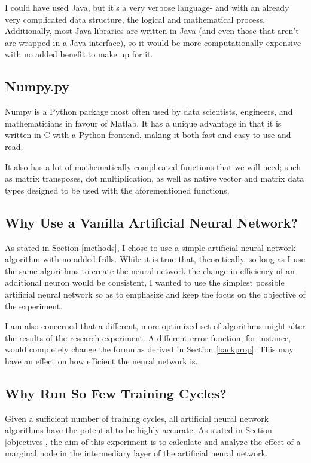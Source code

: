 \documentclass[12pt]{article}
\begin{document}
I could have used Java, but it's a very verbose language- and with an already very complicated data structure, the logical and mathematical process. Additionally, most Java libraries are written in Java (and even those that aren't are wrapped in a Java interface), so it would be more computationally expensive with no added benefit to make up for it.

\subsection{Numpy.py}

Numpy is a Python package most often used by data scientists, engineers, and mathematicians in favour of Matlab. It has a unique advantage in that it is written in C with a Python frontend, making it both fast and easy to use and read.

It also has a lot of mathematically complicated functions that we will need; such as matrix transposes, dot multiplication, as well as native vector and matrix data types designed to be used with the aforementioned functions.

\subsection{Why Use a Vanilla Artificial Neural Network?}

As stated in Section \ref{methods}, I chose to use a simple artificial neural network algorithm with no added frills. While it is true that, theoretically, so long as I use the same algorithms to create the neural network the change in efficiency of an additional neuron would be consistent, I wanted to use the simplest possible artificial neural network so as to emphasize and keep the focus on the objective of the experiment.

I am also concerned that a different, more optimized set of algorithms might alter the results of the research experiment. A different error function, for instance, would completely change the formulas derived in Section \ref{backprop}. This may have an effect on how efficient the neural network is.

\subsection{Why Run So Few Training Cycles?}

Given a sufficient number of training cycles, all artificial neural network algorithms have the potential to be highly accurate. As stated in Section \ref{objectives}, the aim of this experiment is to calculate and analyze the effect of a marginal node in the intermediary layer of the artificial neural network.
\end{document}
